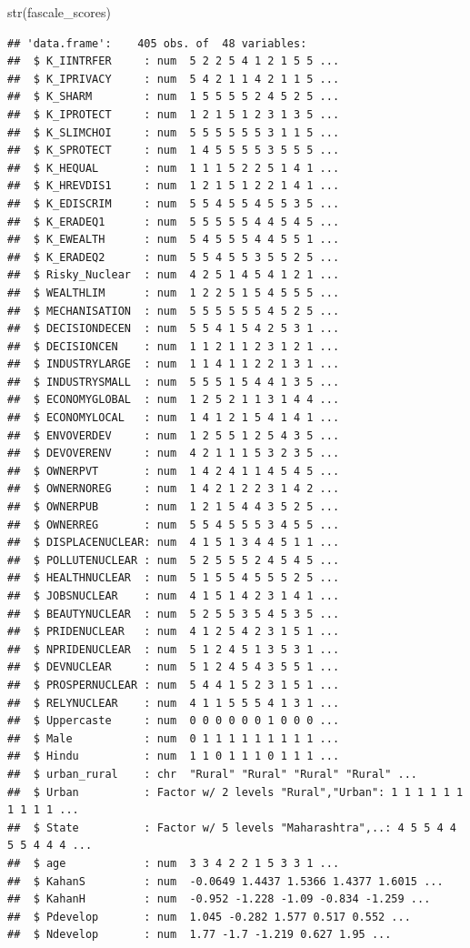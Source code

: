 \documentclass[
]{article}
\newenvironment{Shaded}{\begin{snugshade}}{\end{snugshade}}
\newcommand{\FunctionTok}[1]{\textcolor[rgb]{0.00,0.00,0.00}{#1}}
\newcommand{\NormalTok}[1]{#1}
\begin{document}
\begin{Shaded}
\begin{Highlighting}[]
\FunctionTok{str}\NormalTok{(fascale\_scores) }
\end{Highlighting}
\end{Shaded}

\begin{verbatim}
## 'data.frame':    405 obs. of  48 variables:
##  $ K_IINTRFER     : num  5 2 2 5 4 1 2 1 5 5 ...
##  $ K_IPRIVACY     : num  5 4 2 1 1 4 2 1 1 5 ...
##  $ K_SHARM        : num  1 5 5 5 5 2 4 5 2 5 ...
##  $ K_IPROTECT     : num  1 2 1 5 1 2 3 1 3 5 ...
##  $ K_SLIMCHOI     : num  5 5 5 5 5 5 3 1 1 5 ...
##  $ K_SPROTECT     : num  1 4 5 5 5 5 3 5 5 5 ...
##  $ K_HEQUAL       : num  1 1 1 5 2 2 5 1 4 1 ...
##  $ K_HREVDIS1     : num  1 2 1 5 1 2 2 1 4 1 ...
##  $ K_EDISCRIM     : num  5 5 4 5 5 4 5 5 3 5 ...
##  $ K_ERADEQ1      : num  5 5 5 5 5 4 4 5 4 5 ...
##  $ K_EWEALTH      : num  5 4 5 5 5 4 4 5 5 1 ...
##  $ K_ERADEQ2      : num  5 5 4 5 5 3 5 5 2 5 ...
##  $ Risky_Nuclear  : num  4 2 5 1 4 5 4 1 2 1 ...
##  $ WEALTHLIM      : num  1 2 2 5 1 5 4 5 5 5 ...
##  $ MECHANISATION  : num  5 5 5 5 5 5 4 5 2 5 ...
##  $ DECISIONDECEN  : num  5 5 4 1 5 4 2 5 3 1 ...
##  $ DECISIONCEN    : num  1 1 2 1 1 2 3 1 2 1 ...
##  $ INDUSTRYLARGE  : num  1 1 4 1 1 2 2 1 3 1 ...
##  $ INDUSTRYSMALL  : num  5 5 5 1 5 4 4 1 3 5 ...
##  $ ECONOMYGLOBAL  : num  1 2 5 2 1 1 3 1 4 4 ...
##  $ ECONOMYLOCAL   : num  1 4 1 2 1 5 4 1 4 1 ...
##  $ ENVOVERDEV     : num  1 2 5 5 1 2 5 4 3 5 ...
##  $ DEVOVERENV     : num  4 2 1 1 1 5 3 2 3 5 ...
##  $ OWNERPVT       : num  1 4 2 4 1 1 4 5 4 5 ...
##  $ OWNERNOREG     : num  1 4 2 1 2 2 3 1 4 2 ...
##  $ OWNERPUB       : num  1 2 1 5 4 4 3 5 2 5 ...
##  $ OWNERREG       : num  5 5 4 5 5 5 3 4 5 5 ...
##  $ DISPLACENUCLEAR: num  4 1 5 1 3 4 4 5 1 1 ...
##  $ POLLUTENUCLEAR : num  5 2 5 5 5 2 4 5 4 5 ...
##  $ HEALTHNUCLEAR  : num  5 1 5 5 4 5 5 5 2 5 ...
##  $ JOBSNUCLEAR    : num  4 1 5 1 4 2 3 1 4 1 ...
##  $ BEAUTYNUCLEAR  : num  5 2 5 5 3 5 4 5 3 5 ...
##  $ PRIDENUCLEAR   : num  4 1 2 5 4 2 3 1 5 1 ...
##  $ NPRIDENUCLEAR  : num  5 1 2 4 5 1 3 5 3 1 ...
##  $ DEVNUCLEAR     : num  5 1 2 4 5 4 3 5 5 1 ...
##  $ PROSPERNUCLEAR : num  5 4 4 1 5 2 3 1 5 1 ...
##  $ RELYNUCLEAR    : num  4 1 1 5 5 5 4 1 3 1 ...
##  $ Uppercaste     : num  0 0 0 0 0 0 1 0 0 0 ...
##  $ Male           : num  0 1 1 1 1 1 1 1 1 1 ...
##  $ Hindu          : num  1 1 0 1 1 1 0 1 1 1 ...
##  $ urban_rural    : chr  "Rural" "Rural" "Rural" "Rural" ...
##  $ Urban          : Factor w/ 2 levels "Rural","Urban": 1 1 1 1 1 1 1 1 1 1 ...
##  $ State          : Factor w/ 5 levels "Maharashtra",..: 4 5 5 4 4 5 5 4 4 4 ...
##  $ age            : num  3 3 4 2 2 1 5 3 3 1 ...
##  $ KahanS         : num  -0.0649 1.4437 1.5366 1.4377 1.6015 ...
##  $ KahanH         : num  -0.952 -1.228 -1.09 -0.834 -1.259 ...
##  $ Pdevelop       : num  1.045 -0.282 1.577 0.517 0.552 ...
##  $ Ndevelop       : num  1.77 -1.7 -1.219 0.627 1.95 ...
\end{verbatim}
\end{document}
